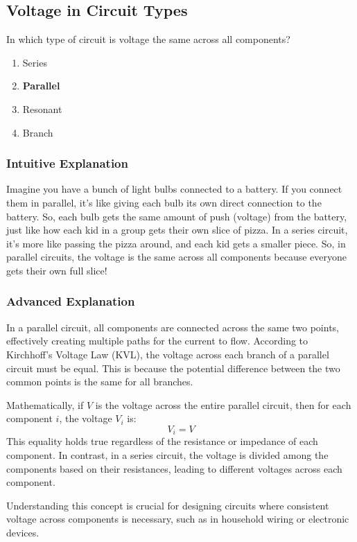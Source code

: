\subsection{Voltage in Circuit Types}
\label{T5D14}

\begin{tcolorbox}[colback=gray!10!white,colframe=black!75!black,title=T5D14]
In which type of circuit is voltage the same across all components?
\begin{enumerate}[label=\Alph*]
    \item Series
    \item \textbf{Parallel}
    \item Resonant
    \item Branch
\end{enumerate}
\end{tcolorbox}

\subsubsection{Intuitive Explanation}
Imagine you have a bunch of light bulbs connected to a battery. If you connect them in parallel, it's like giving each bulb its own direct connection to the battery. So, each bulb gets the same amount of push (voltage) from the battery, just like how each kid in a group gets their own slice of pizza. In a series circuit, it's more like passing the pizza around, and each kid gets a smaller piece. So, in parallel circuits, the voltage is the same across all components because everyone gets their own full slice!

\subsubsection{Advanced Explanation}
In a parallel circuit, all components are connected across the same two points, effectively creating multiple paths for the current to flow. According to Kirchhoff's Voltage Law (KVL), the voltage across each branch of a parallel circuit must be equal. This is because the potential difference between the two common points is the same for all branches.

Mathematically, if \( V \) is the voltage across the entire parallel circuit, then for each component \( i \), the voltage \( V_i \) is:
\[
V_i = V
\]
This equality holds true regardless of the resistance or impedance of each component. In contrast, in a series circuit, the voltage is divided among the components based on their resistances, leading to different voltages across each component.

Understanding this concept is crucial for designing circuits where consistent voltage across components is necessary, such as in household wiring or electronic devices.

